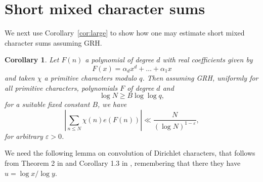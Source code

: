 \documentclass[12pt]{amsart}
\newtheorem{corollary}{Corollary}
\def\le{\leqslant}
\def\ge{\geqslant}
\begin{document}
\section{Short mixed character sums}
\label{app}
We next use Corollary~\ref{cor:large} to show how one may estimate short mixed character sums assuming GRH.
\begin{corollary}
\label{cor:Hild}
Let $F(n)$ a polynomial of degree $d$ with real coefficients given by
$$F(x)=\alpha_d x^d+\dots+\alpha_1 x$$
and taken $\chi$ a primitive characters modulo $q$. Then assuming GRH, uniformly for all primitive characters, polynomials $F$ of degree $d$ and 
\begin{equation}
\label{eq:cond}
\log{N}\ge B\log\log{q},
\end{equation}
for a suitable fixed constant $B$, we have
\begin{equation*}
\left| \sum_{n \le N} \chi(n) e(F(n))\right|\ll\frac{N}{(\log N)^{1-\varepsilon}},
\end{equation*}
for arbitrary $\varepsilon>0$.
\end{corollary}

We need the following lemma on convolution of Dirichlet characters, that follows from Theorem 2 in \cite{GS1} and Corollary 1.3 in \cite{HT}, remembering that there they have $u=\log x /\log y$.
\end{document}
